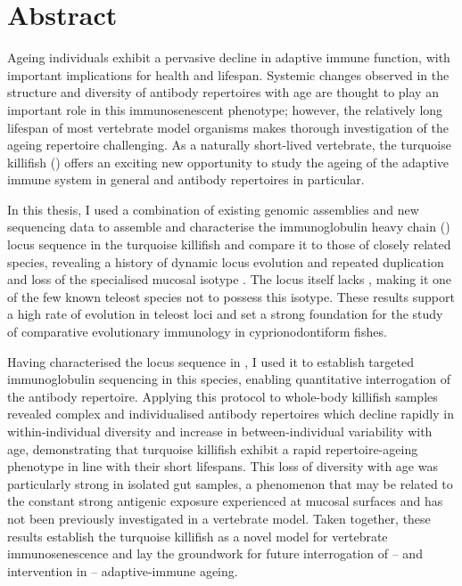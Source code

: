 {
\cleardoublepage
\setsinglecolumn
\chapter*{\centering \LARGE Abstract}
\thispagestyle{empty}

Ageing individuals exhibit a pervasive decline in adaptive immune function, with important implications for health and lifespan. Systemic changes observed in the structure and diversity of antibody repertoires with age are thought to play an important role in this immunosenescent phenotype; however, the relatively long lifespan of most vertebrate model organisms makes thorough investigation of the ageing repertoire challenging. As a naturally short-lived vertebrate, the turquoise killifish (\nfu) offers an exciting new opportunity to study the ageing of the adaptive immune system in general and antibody repertoires in particular.

In this thesis, I used a combination of existing genomic assemblies and new sequencing data to assemble and characterise the immunoglobulin heavy chain (\igh{}) locus sequence in the turquoise killifish and compare it to those of closely related species, revealing a history of dynamic locus evolution and repeated duplication and loss of the specialised mucosal isotype . The \Nfu locus itself lacks , making it one of the few known teleost species not to possess this isotype. These results support a high rate of evolution in teleost \igh{} loci and set a strong foundation for the study of comparative evolutionary immunology in cyprionodontiform fishes.

Having characterised the \igh{} locus sequence in \Nfu, I used it to establish targeted immunoglobulin sequencing in this species, enabling quantitative interrogation of the antibody repertoire. Applying this protocol to whole-body killifish samples revealed complex and individualised antibody repertoires which decline rapidly in within-individual diversity and increase in between-individual variability with age, demonstrating that turquoise killifish exhibit a rapid repertoire-ageing phenotype in line with their short lifespans. This loss of diversity with age was particularly strong in isolated gut samples, a phenomenon that may be related to the constant strong antigenic exposure experienced at mucosal surfaces and has not been previously investigated in a vertebrate model. Taken together, these results establish the turquoise killifish as a novel model for vertebrate immunosenescence and lay the groundwork for future interrogation of -- and intervention in -- adaptive-immune ageing.
}
